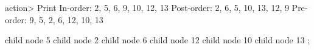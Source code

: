 


\begin{TcblistingMintedTerminal}
action> Print
  In-order:  2,  5,  6,  9, 10, 12, 13
Post-order:  2,  6,  5, 10, 13, 12,  9
 Pre-order:  9,  5,  2,  6, 12, 10, 13
\end{TcblistingMintedTerminal}

\begin{TikzTreeStyle}
    child {node {5}
      child {node {2} }
      child {node {6} }
    }
    child {node {12}
      child {node {10} }
      child {node {13} }
    };
\end{TikzTreeStyle}